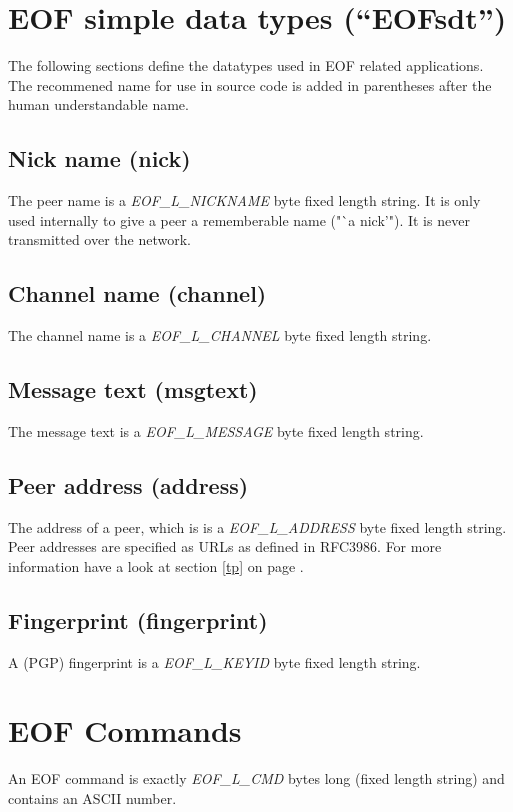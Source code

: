 \documentclass[12pt,a4paper]{book}
\begin{document}
\section{EOF simple data types ("`EOFsdt"')}
The following sections define the datatypes used in EOF related
applications. The recommened name for use in source
code is added in parentheses after the human understandable name.
\subsection{Nick name (nick)}
The peer name is a \emph{EOF\_L\_NICKNAME} byte fixed length string.
It is only used internally to give a peer a rememberable name ("`a nick'").
It is never transmitted over the network.
\subsection{Channel name (channel)}
The channel name is a \emph{EOF\_L\_CHANNEL} byte fixed length string.
\subsection{Message text (msgtext)}
The message text is a \emph{EOF\_L\_MESSAGE} byte fixed length string.
\subsection{Peer address (address)}
The address of a peer, which is is a \emph{EOF\_L\_ADDRESS}
byte fixed length string. Peer addresses are specified as
URLs as defined in RFC3986\cite{uri-1}. For more information have
a look at section \ref{tp} on page \pageref{tp}.
\subsection{Fingerprint (fingerprint)}
A (PGP) fingerprint is a \emph{EOF\_L\_KEYID} byte fixed length string.
\section{EOF Commands}
An EOF command is exactly \emph{EOF\_L\_CMD} bytes long (fixed length string)
and contains an ASCII number.
\end{document}
